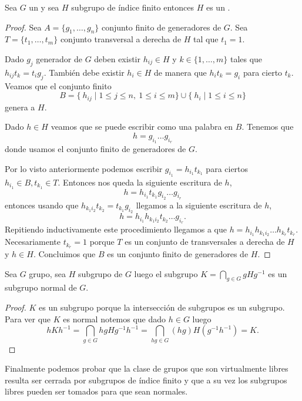 \documentclass[tesis.tex]{subfiles}
\begin{document}
\begin{lema}\label{lema_subg_fg}
	Sea $G$ un \fg y sea $H$ subgrupo de índice finito entonces $H$ es un \fg.
\end{lema}
\begin{proof}
	Sea $A = \{g_1, \dots, g_n\}$ conjunto finito de generadores de $G$.
	Sea $T =\{t_1, \dots, t_m\}$ conjunto transversal a derecha de $H$ tal que $t_1=1$.
	
	Dado $g_j$ generador de $G$ deben existir $h_{ij} \in H$ y $k \in \{1, \dots, m\}$ tales que $h_{ij}t_{k} = t_ig_j$.
	También debe existir $h_i \in H$ de manera que $ h_i t_{k} = g_i$ para cierto $t_k$.
	Veamos que el conjunto finito 
	\[
	B = \{ \ h_{ ij}  \mid {1 \le j \le n, \  1 \le i \le m } \} \cup \{ \ h_i \mid {1 \le i \le n} \}
	\]
	genera a $H$.
	
	Dado $h \in H$ veamos que se puede escribir como una palabra en $B$. 
	Tenemos que 
	\[
	h = g_{i_1}\dots g_{i_r}
	\]
	donde usamos el conjunto finito de generadores de $G$.
	
	Por lo visto anteriormente podemos escribir  $g_{i_1} = h_{i_1}t_{k_1}$ para ciertos
	$h_{i_{1}} \in B, t_{k_{1}} \in T$.
	Entonces nos queda la siguiente escritura de $h$,
	\[
	h = h_{i_1}t_{k_1} g_{i_2}\dots g_{i_r}
	\]
	entonces usando que $h_{k_{1}i_{2}}t_{k_2} = t_{k_1}g_{i_2} $ llegamos a la siguiente escritura de $h$,
	\[
	h = h_{i_1}h_{k_{1}i_{2}}t_{k_2}\dots g_{i_r}.
	\]
	Repitiendo inductivamente este procedimiento llegamos a que $h =h_{i_1}h_{k_{1}i_{2}} \dots h_{k_{r}}t_{k_r}$.
	Necesariamente $t_{k_r} = 1$ porque $T$ es un conjunto de transversales a derecha de $H$ y $h \in H$.
	Concluimos que $B$ es un conjunto finito de generadores de $H$.
	
\end{proof}



\begin{lema}\label{lema_int_normal}
	Sea $G$ grupo, sea $H$ subgrupo de $G$ luego el subgrupo $K = \bigcap_{g \in G} gHg^{-1}$ es un subgrupo normal de $G$.
\end{lema}

\begin{proof}
	$K$ es un subgrupo porque la intersección de subgrupos es un subgrupo.
	Para ver que $K$ es normal notemos que dado $h \in G$ luego 
	\[
		 hKh^{-1} = \bigcap_{g \in G} hgHg^{-1}h^{-1} = \bigcap_{hg \in G} (hg)H(g^{-1}h^{-1}) =  K. 	
	\]
\end{proof}

Finalmente podemos probar que la clase de grupos que son virtualmente libres resulta ser cerrada por subgrupos de índice finito y que a su vez los subgrupos libres pueden ser tomados para que sean normales.
\end{document}
